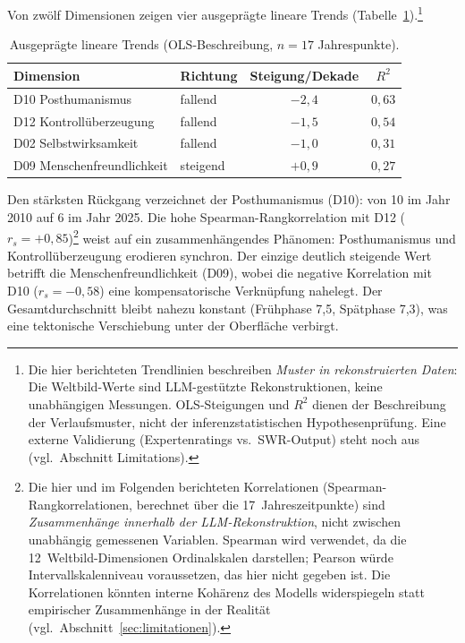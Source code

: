 \documentclass[12pt,a4paper]{article}
\begin{document}
Von zwölf Dimensionen zeigen vier ausgeprägte lineare Trends (Tabelle~\ref{tab:trends}).\footnote{Die hier berichteten Trendlinien beschreiben \textit{Muster in rekonstruierten Daten}: Die Weltbild-Werte sind LLM-gestützte Rekonstruktionen, keine unabhängigen Messungen. OLS-Steigungen und $R^2$ dienen der Beschreibung der Verlaufsmuster, nicht der inferenzstatistischen Hypothesenprüfung. Eine externe Validierung (Expertenratings vs.\ SWR-Output) steht noch aus (vgl.\ Abschnitt Limitations).}

\begin{table}[htbp]
  \centering
  \caption{Ausgeprägte lineare Trends (OLS-Beschreibung, $n=17$ Jahrespunkte).}
  \label{tab:trends}
  \begin{tabular}{l l c c}
    \toprule
    \textbf{Dimension} & \textbf{Richtung} & \textbf{Steigung/Dekade} & $R^2$ \\
    \midrule
    D10 Posthumanismus       & fallend  & $-2{,}4$ & $0{,}63$ \\
    \addlinespace[2pt]
    D12 Kontrollüberzeugung & fallend  & $-1{,}5$ & $0{,}54$ \\
    \addlinespace[2pt]
    D02 Selbstwirksamkeit    & fallend  & $-1{,}0$ & $0{,}31$ \\
    \addlinespace[2pt]
    D09 Menschenfreundlichkeit & steigend & $+0{,}9$ & $0{,}27$ \\
    \bottomrule
  \end{tabular}
\end{table}

Den stärksten Rückgang verzeichnet der Posthumanismus (D10): von 10 im Jahr 2010 auf 6 im Jahr 2025. Die hohe Spearman-Rangkorrelation mit D12 ($r_s = +0{,}85$)\footnote{Die hier und im Folgenden berichteten Korrelationen (Spearman-Rangkorrelationen, berechnet über die 17~Jahreszeitpunkte) sind \emph{Zusammenhänge innerhalb der LLM-Rekonstruktion}, nicht zwischen unabhängig gemessenen Variablen. Spearman wird verwendet, da die 12~Weltbild-Dimensionen Ordinalskalen darstellen; Pearson würde Intervallskalenniveau voraussetzen, das hier nicht gegeben ist. Die Korrelationen könnten interne Kohärenz des Modells widerspiegeln statt empirischer Zusammenhänge in der Realität (vgl.\ Abschnitt~\ref{sec:limitationen}).} weist auf ein zusammenhängendes Phänomen: Posthumanismus und Kontrollüberzeugung erodieren synchron. Der einzige deutlich steigende Wert betrifft die Menschenfreundlichkeit (D09), wobei die negative Korrelation mit D10 ($r_s = -0{,}58$) eine kompensatorische Verknüpfung nahelegt. Der Gesamtdurchschnitt bleibt nahezu konstant (Frühphase 7,5, Spätphase 7,3), was eine tektonische Verschiebung unter der Oberfläche verbirgt.
\end{document}
